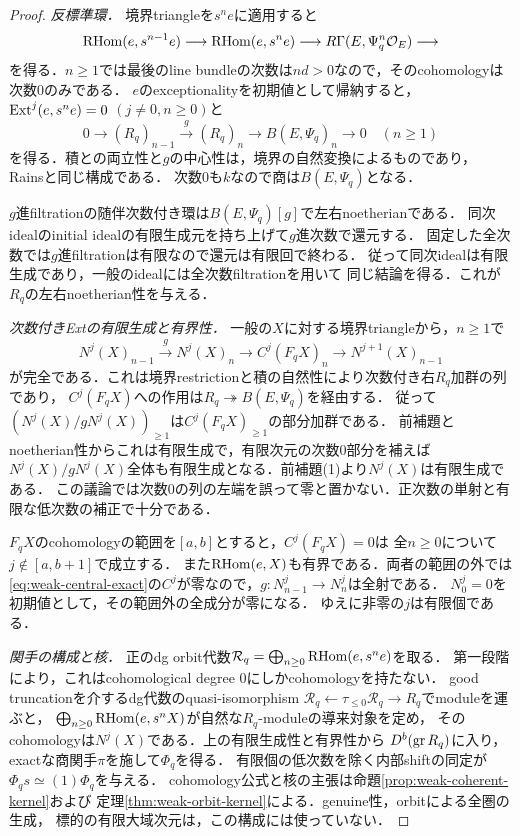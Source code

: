 \begin{proof}
\emph{反標準環．}
境界triangleを$s^ne$に適用すると
\[
 \operatorname{RHom}(e,s^{n-1}e)\longrightarrow\operatorname{RHom}(e,s^ne)
 \longrightarrow R\Gamma(E,\Psi_q^n\mathcal O_E)\longrightarrow
\]
を得る．$n\ge1$では最後のline bundleの次数は$nd>0$なので，そのcohomologyは次数0のみである．
$e$のexceptionalityを初期値として帰納すると，
$\operatorname{Ext}^j(e,s^ne)=0$ $(j\ne0,n\ge0)$と
\[
 0\longrightarrow(R_q)_{n-1}\xrightarrow{\ g\ }(R_q)_n
 \longrightarrow B(E,\Psi_q)_n\longrightarrow0\quad(n\ge1)
\]
を得る．積との両立性と$g$の中心性は，境界の自然変換によるものであり，
Rains\cite[Proposition 5.1と式(5.3)]{Filtered}と同じ構成である．
次数0も$k$なので商は$B(E,\Psi_q)$となる．

$g$進filtrationの随伴次数付き環は$B(E,\Psi_q)[g]$で左右noetherianである．
同次idealのinitial idealの有限生成元を持ち上げて$g$進次数で還元する．
固定した全次数では$g$進filtrationは有限なので還元は有限回で終わる．
従って同次idealは有限生成であり，一般のidealには全次数filtrationを用いて
同じ結論を得る．これが$R_q$の左右noetherian性を与える．

\emph{次数付きExtの有限生成と有界性．}
一般の$X$に対する境界triangleから，$n\ge1$で
\begin{equation}\label{eq:weak-central-exact}
 N^j(X)_{n-1}\xrightarrow{\ g\ }N^j(X)_n
 \longrightarrow C^j(F_qX)_n\longrightarrow N^{j+1}(X)_{n-1}
\end{equation}
が完全である．これは境界restrictionと積の自然性により次数付き右$R_q$加群の列であり，
$C^j(F_qX)$への作用は$R_q\twoheadrightarrow B(E,\Psi_q)$を経由する．
従って$(N^j(X)/gN^j(X))_{\ge1}$は$C^j(F_qX)_{\ge1}$の部分加群である．
前補題とnoetherian性からこれは有限生成で，有限次元の次数0部分を補えば
$N^j(X)/gN^j(X)$全体も有限生成となる．前補題(1)より$N^j(X)$は有限生成である．
この議論では次数0の列の左端を誤って零と置かない．正次数の単射と有限な低次数の補正で十分である．

$F_qX$のcohomologyの範囲を$[a,b]$とすると，$C^j(F_qX)=0$は
全$n\ge0$について$j\notin[a,b+1]$で成立する．
また$\operatorname{RHom}(e,X)$も有界である．両者の範囲の外では
\eqref{eq:weak-central-exact}の$C^j$が零なので，$g:N^j_{n-1}\to N^j_n$は全射である．
$N^j_0=0$を初期値として，その範囲外の全成分が零になる．
ゆえに非零の$j$は有限個である．

\emph{関手の構成と核．}
正のdg orbit代数$\mathcal R_q=\bigoplus_{n\ge0}\operatorname{RHom}(e,s^ne)$を取る．
第一段階により，これはcohomological degree 0にしかcohomologyを持たない．
good truncationを介するdg代数のquasi-isomorphism
$\mathcal R_q\leftarrow\tau_{\le0}\mathcal R_q\to R_q$でmoduleを運ぶと，
$\bigoplus_{n\ge0}\operatorname{RHom}(e,s^nX)$が自然な$R_q$-moduleの導来対象を定め，
そのcohomologyは$N^j(X)$である．上の有限生成性と有界性から
$D^b(\operatorname{gr} R_q)$に入り，exactな商関手$\pi$を施して$\Phi_q$を得る．
有限個の低次数を除く内部shiftの同定が$\Phi_qs\simeq(1)\Phi_q$を与える．
cohomology公式と核の主張は命題\ref{prop:weak-coherent-kernel}および
定理\ref{thm:weak-orbit-kernel}による．genuine性，orbitによる全圏の生成，
標的の有限大域次元は，この構成には使っていない．
\end{proof}

